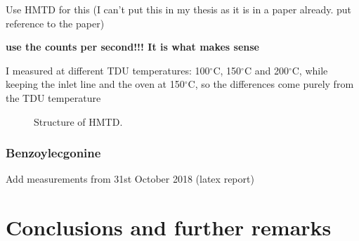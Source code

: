 Use HMTD for this (I can't put this in my thesis as it is in a paper already. put reference to the paper)   

\textbf{use the counts per second!!! It is what makes sense}

I measured at different TDU temperatures: 100$^{\circ}$C, 150$^{\circ}$C and 200$^{\circ}$C, while keeping the inlet line and the oven at 150$^{\circ}$C, so the differences come purely from the TDU temperature


\begin{figure}
\caption{Structure of HMTD.}\label{fig:hmtd}
\end{figure}

\subsubsection{Benzoylecgonine}
Add measurements from 31st October 2018 (latex report)



\section{Conclusions and further remarks}














